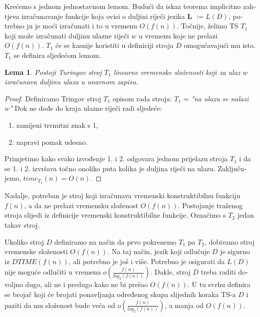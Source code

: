 \documentclass[12pt]{rectors}
\newtheorem{lemma}[theorem]{Lema}
\begin{document}
\begin{otherlanguage}{croatian}
Krećemo s jednom jednostavnom lemom. \newline
Budući da iskaz teorema implicitno zahtjeva izračunavanje funkcije koja ovisi o duljini riječi jezika \textbf{L} $:= L(D)$, potrebno ju je moći izračunati i to u vremenu $O \left ( f(n) \right )$.
Točnije, želimo TS $T_1$ koji može izračunati duljinu ulazne riječi $w$ u vremenu koje ne prelazi $O(f(n))$. $T_1$ će se kasnije koristiti u definiciji stroja $D$ omogućavajući mu isto.
 \newline
$T_1$ se definira sljedećom lemom.
\begin{lemma}\label{lemma:t1}
Postoji Turingov stroj $T_1$ linearne vremenske složenosti koji za ulaz $w$ izračunava  duljinu ulaza u unarnom zapisu.
\end{lemma}
\begin{proof}
Definiramo Tringov stroj $T_1$ opisom rada stroja:\newline
$T_1$ = \textit{"na ulazu se nalazi $w$"}\newline
Dok ne dođe do kraja ulazne riječi radi sljedeće:
\begin{enumerate}
    \item zamijeni trenutni znak s 1,
    \item napravi pomak udesno.
\end{enumerate}
Primjetimo kako svako izvođenje 1. i 2. odgovara jednom prijelazu stroja $T_1$ i da
se 1. i 2. izvršava točno onoliko puta kolika je duljina riječi na ulazu.
Zaključujemo, $time_{T_1}(n) = O(n)$.
\end{proof}

Nadalje, potreban je stroj koji izračunava vremenski konstruktibilnu funkciju $f(n)$, 
a da ne prelazi vremensku složenost $O(f(n))$.
Postojanje traženog stroja slijedi iz definicije vremenski konstruktibilne funkcije.
Označimo s $T_2$ jedan takav stroj.

Ukoliko stroj $D$ definiramo na način da prvo pokrenemo $T_1$ pa $T_2$,
dobivamo stroj vremenske složenosti $O(f(n))$.
Na taj način, jezik koji odlučuje $D$ je sigurno iz $DTIME(f(n))$, ali potrebno je još i više. Potrebno je osigurati da $L(D)$  nije moguće odlučiti u vremenu $o( \frac {f\left ( n \right )}{log_2\left ( f\left ( n \right ) \right )})$. 
Dakle, stroj $D$ treba raditi dovoljno dugo, ali ne i predugo kako ne bi prešao $O(f(n))$.
U tu svrhu definira se brojač koji će brojati ponavljanja određenog skupa slijednih koraka TS-a $D$ i paziti da mu složenost bude veća od $o( \frac {f\left ( n \right )}{log_2\left ( f\left ( n \right ) \right )})$, a manja od $O(f(n))$.


\end{otherlanguage}
\end{document}
